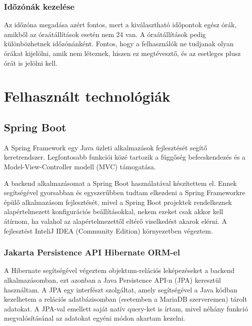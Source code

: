 \documentclass[a4paper,12pt]{report}
\theoremstyle{definition}
\theoremstyle{remark}
\begin{document}
	\subsection{Időzónák kezelése}

Az időzóna megadása azért fontos, mert a  kiválasztható időpontok egész órák, amikből az óraátállítások esetén nem 24 van. A óraátállítások pedig különbözhetnek időzónánként. Fontos, hogy a felhasználók ne tudjanak olyan órákat kijelölni, amik nem léteznek, hiszen ez megtévesztő, és az esetleges plusz órát is jelölni kell.

\chapter{Felhasznált technológiák}

\section{Spring Boot}

A Spring Framework egy Java üzleti alkalmazások fejlesztését segítő keretrendszer. Legfontosabb funkciói közé tartozik a függőség befecskendezés és a Model-View-Controller modell (MVC) támogatása.

A backend alkalmazásomat a Spring Boot\cite{Springwebsite} használatával készítettem el. Ennek segítségével gyorsabban és egyszerűbben tudtam elkezdeni a Spring Frameworkre épülő alkalmazásom fejlesztését, mivel a Spring Boot projektek rendelkeznek alapértelmezett konfigurációs beállításokkal, nekem ezeket csak akkor kell átírnom, ha valahol az alapértelmezettől eltérő viselkedést akarok elérni. A fejlesztést InteliJ IDEA (Community Edition)\cite{IDEAwebsite} környezetben végeztem.

	\subsection{Jakarta Persistence API Hibernate ORM-el}

A Hibernate\cite{Hibernatewebsite} segítségével végeztem objektum-relációs leképezéseket a backend alkalmazásomban, ezt azonban a Java Persistence API-n (JPA)\cite{JPAwebsite} keresztül használtam. A JPA egy interfészt szolgáltat, amely segítségével a Java kódban kezelhetem a relációs adatbázisomban (esetemben a MariaDB szerveremen) tárolt adatokat. A JPA-val emellett saját natív query-ket is írtam, mivel néhány funkció megvalósításánal az adatokat egyéni módon akartam kezelni.
\end{document}
